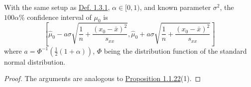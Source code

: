 \documentclass[11pt,fleqn]{book} %
\begin{document}
\begin{proposition} \label{prop:133}
With the same setup as \hyperref[def:131]{Def. 1.3.1}, \(\alpha \in [0, 1)\), and known parameter \(\sigma^2\), the \(100\alpha\%\) confidence interval of \(\mu_0\) is
\[
\left[\hat{\mu}_0 - a\sigma\sqrt{\frac1n + \frac{(x_0 - \bar{x})^2}{s_{xx}}}, \hat{\mu}_0 + a\sigma\sqrt{\frac1n + \frac{(x_0 - \bar{x})^2}{s_{xx}}}\right]
\]
where \(a = \Phi^{-1}\left(\frac12(1 + \alpha)\right)\), \(\Phi\) being the distribution function of the standard normal distribution.
\end{proposition}
\begin{proof} The arguments are analogous to \hyperref[prop:1122]{Proposition 1.1.22}(1). \end{proof}
\end{document}
